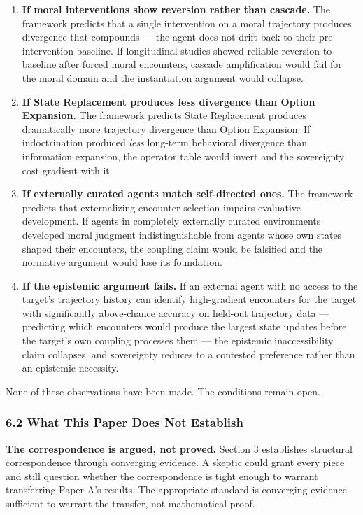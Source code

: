 \documentclass[
]{article}
\begin{document}
\begin{enumerate}
\def\labelenumi{\arabic{enumi}.}
\item
  \textbf{If moral interventions show reversion rather than cascade.}
  The framework predicts that a single intervention on a moral
  trajectory produces divergence that compounds --- the agent does not
  drift back to their pre-intervention baseline. If longitudinal studies
  showed reliable reversion to baseline after forced moral encounters,
  cascade amplification would fail for the moral domain and the
  instantiation argument would collapse.
\item
  \textbf{If State Replacement produces less divergence than Option
  Expansion.} The framework predicts State Replacement produces
  dramatically more trajectory divergence than Option Expansion. If
  indoctrination produced \emph{less} long-term behavioral divergence
  than information expansion, the operator table would invert and the
  sovereignty cost gradient with it.
\item
  \textbf{If externally curated agents match self-directed ones.} The
  framework predicts that externalizing encounter selection impairs
  evaluative development. If agents in completely externally curated
  environments developed moral judgment indistinguishable from agents
  whose own states shaped their encounters, the coupling claim would be
  falsified and the normative argument would lose its foundation.
\item
  \textbf{If the epistemic argument fails.} If an external agent with no
  access to the target's trajectory history can identify high-gradient
  encounters for the target with significantly above-chance accuracy on
  held-out trajectory data --- predicting which encounters would produce
  the largest state updates before the target's own coupling processes
  them --- the epistemic inaccessibility claim collapses, and
  sovereignty reduces to a contested preference rather than an epistemic
  necessity.
\end{enumerate}

None of these observations have been made. The conditions remain open.

\subsubsection{6.2 What This Paper Does Not
Establish}\label{what-this-paper-does-not-establish}

\textbf{The correspondence is argued, not proved.} Section 3 establishes
structural correspondence through converging evidence. A skeptic could
grant every piece and still question whether the correspondence is tight
enough to warrant transferring Paper A's results. The appropriate
standard is converging evidence sufficient to warrant the transfer, not
mathematical proof.
\end{document}
